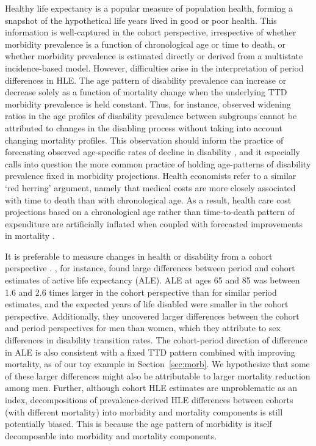 \documentclass[12pt,oneside,a4paper]{article} %
\begin{document}
Healthy life expectancy is a popular measure of population health, forming a snapshot of the hypothetical life years lived in good or poor health. This information is well-captured in the 
cohort perspective, irrespective of whether morbidity prevalence is a function of
chronological age or time to death, or whether morbidity prevalence is estimated directly or derived from a multistate incidence-based model. However, difficulties arise in the
interpretation of period differences in HLE. The age
pattern of disability prevalence can increase or decrease solely as a function of mortality
change when the underlying TTD morbidity prevalence is held constant. Thus, for
instance, observed widening ratios in the age profiles of disability prevalence
between subgroups \citep{Crimmins2001} cannot be attributed to changes in the
disabling process without taking into account changing mortality profiles. This
observation should inform the practice of forecasting observed
age-specific rates of decline in disability \citep{Manton2006,Khaw1999}, and it
especially calls into question the more common practice of holding age-patterns of disability prevalence fixed
in morbidity projections.
Health economists refer to a similar `red herring' argument, namely that medical costs are more closely associated with time to death than with chronological age. As a result, health
care cost projections based on a chronological age rather than time-to-death
pattern of expenditure are artificially inflated when coupled with forecasted improvements in mortality \citep{Zweifel1999,lee2002approach,Geue2014}.

It is preferable to measure changes in health or disability from a cohort perspective \citep{Manton2000,Manton2008,Christensen2013}.
\citet{Manton2000}, for instance, found large differences between period and
cohort estimates of active life expectancy (ALE). ALE at ages 65 and 85 was
between 1.6 and 2.6 times larger in the cohort perspective than for similar
period estimates, and the expected years of life disabled were smaller in the
cohort perspective.
Additionally, they uncovered larger differences between the cohort and period
perspectives for men than women, which they attribute to sex differences in
disability transition rates. The cohort-period direction of difference in ALE is also consistent with a fixed TTD pattern combined with improving mortality, as of our toy example in Section~\ref{sec:morb}. We hypothesize that some of these
larger differences might also be attributable to larger mortality reduction
among men. Further, although cohort HLE estimates are unproblematic as an index,
decompositions of prevalence-derived HLE differences between cohorts (with different mortality) into morbidity and
mortality components is still potentially biased. This is because the age pattern of
morbidity is itself decomposable into morbidity and
mortality components.  
\end{document}

